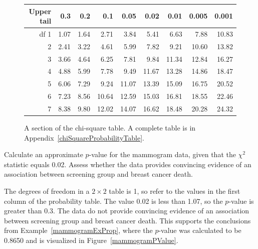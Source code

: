\begin{figure}[h]
	\centering
	\begin{tabular}{r | rrrr | rrrr |}
		\hline
		Upper tail & 0.3 & 0.2 & 0.1 & 0.05 & 0.02 & 0.01 & 0.005 & 0.001 \\ 
		\hline
		df \hfill 1 & \footnotesize 1.07 & \footnotesize 1.64 & \footnotesize 2.71 & \footnotesize 3.84 & \footnotesize 5.41 & \footnotesize 6.63 & \footnotesize 7.88 & \footnotesize 10.83 \\ 
		\hfill 2 & \footnotesize 2.41 & \footnotesize 3.22 & \footnotesize 4.61 & \footnotesize 5.99 & \footnotesize 7.82 & \footnotesize 9.21 & \footnotesize 10.60 & \footnotesize 13.82 \\ 
		3 & \footnotesize 3.66 & \footnotesize 4.64 & \footnotesize 6.25 & \footnotesize 7.81 & \footnotesize 9.84 & \footnotesize 11.34 & \footnotesize 12.84 & \footnotesize 16.27 \\ 
		4 & \footnotesize 4.88 & \footnotesize 5.99 & \footnotesize 7.78 & \footnotesize 9.49 & \footnotesize 11.67 & \footnotesize 13.28 & \footnotesize 14.86 & \footnotesize 18.47 \\ 
		5 & \footnotesize 6.06 & \footnotesize 7.29 & \footnotesize 9.24 & \footnotesize 11.07 & \footnotesize 13.39 & \footnotesize 15.09 & \footnotesize 16.75 & \footnotesize 20.52 \\ 
		\hline
		6 & \footnotesize 7.23 & \footnotesize 8.56 & \footnotesize 10.64 & \footnotesize 12.59 & \footnotesize 15.03 & \footnotesize 16.81 & \footnotesize 18.55 & \footnotesize 22.46 \\ 
		7 & \footnotesize 8.38 & \footnotesize 9.80 & \footnotesize 12.02 & \footnotesize 14.07 & \footnotesize 16.62 & \footnotesize 18.48 & \footnotesize 20.28 & \footnotesize 24.32 \\ 
		\hline
	\end{tabular}
	\caption{A section of the chi-square table. A complete table is in Appendix~\vref{chiSquareProbabilityTable}.}
	\label{chiSquareProbabilityTableShort}
\end{figure}

\begin{examplewrap}
\begin{nexample}{Calculate an approximate $p$-value for the mammogram data, given that the $\chi^2$ statistic equals 0.02. Assess whether the data provides convincing evidence of an association between screening group and breast cancer death.}

The degrees of freedom in a $2 \times 2$ table is 1, so refer to the values in the first column of the probability table. The value 0.02 is less than 1.07, so the $p$-value is greater than 0.3. The data do not provide convincing evidence of an association between screening group and breast cancer death. This supports the conclusions from Example~\ref{mammogramExProp}, where the $p$-value was calculated to be 0.8650 and is visualized in Figure~\ref{mammogramPValue}.
\end{nexample}
\end{examplewrap}

